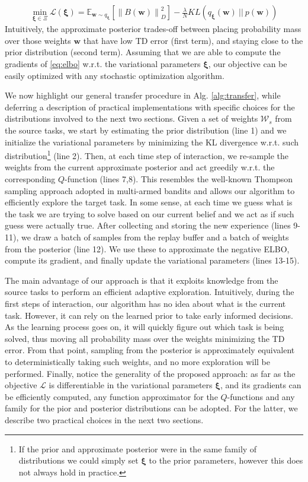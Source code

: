 \documentclass{article}
\newcommand{\norm}[1]{\left\lVert #1 \right\rVert}
\begin{document}
\begin{align} \label{eq:elbo}
\min_{\bm{\xi}\in\Xi} \mathcal{L}(\bm{\xi}) = \mathbb{E}_{\bm{w} \sim q_{\bm{\xi}}}\left[\norm{B(\bm{w})}_D^2\right] - \frac{\lambda}{N}KL\left(q_{\bm{\xi}}(\bm{w})\ ||\ p(\bm{w})\right)
\end{align}
Intuitively, the approximate posterior trades-off between placing probability mass over those weights $\bm{w}$ that have low TD error (first term), and staying close to the prior distribution (second term). Assuming that we are able to compute the gradients of \eqref{eq:elbo} w.r.t. the variational parameters $\bm{\xi}$, our objective can be easily optimized with any stochastic optimization algorithm.

We now highlight our general transfer procedure in Alg. \ref{alg:transfer}, while deferring a description of practical implementations with specific choices for the distributions involved to the next two sections. Given a set of weights $\mathcal{W}_s$ from the source tasks, we start by estimating the prior distribution (line 1) and we initialize the variational parameters by minimizing the KL divergence w.r.t. such distribution\footnote{If the prior and approximate posterior were in the same family of distributions we could simply set $\bm{\xi}$ to the prior parameters, however this does not always hold in practice.} (line 2). Then, at each time step of interaction, we re-sample the weights from the current approximate posterior and act greedily w.r.t. the corresponding $Q$-function (lines 7,8). This resembles the well-known Thompson sampling approach adopted in multi-armed bandits \cite{} and allows our algorithm to efficiently explore the target task. In some sense, at each time we guess what is the task we are trying to solve based on our current belief and we act as if such guess were actually true. After collecting and storing the new experience (lines 9-11), we draw a batch of samples from the replay buffer and a batch of weights from the posterior (line 12). We use these to approximate the negative ELBO, compute its gradient, and finally update the variational parameters (lines 13-15).

The main advantage of our approach is that it exploits knowledge from the source tasks to perform an efficient adaptive exploration. Intuitively, during the first steps of interaction, our algorithm has no idea about what is the current task. However, it can rely on the learned prior to take early informed decisions. As the learning process goes on, it will quickly figure out which task is being solved, thus moving all probability mass over the weights minimizing the TD error. From that point, sampling from the posterior is approximately equivalent to deterministically taking such weights, and no more exploration will be performed. Finally, notice the generality of the proposed approach: as far as the objective $\mathcal{L}$ is differentiable in the variational parameters $\bm{\xi}$, and its gradients can be efficiently computed, any function approximator for the $Q$-functions and any family for the pior and posterior distributions can be adopted. For the latter, we describe two practical choices in the next two sections.
\end{document}
